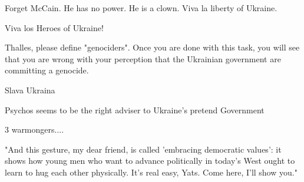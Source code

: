 
Forget McCain. He has no power. He is a clown. Viva la liberty of Ukraine.

\begin{itemize} %
Viva los Heroes of Ukraine!


Thalles, please define "genociders". Once you are done with this task, you will
see that you are wrong with your perception that the Ukrainian government are
committing a genocide.


Slava Ukraina
\end{itemize} %

Psychos seems to be the right adviser to Ukraine's pretend Government

3 warmongers....


"And this gesture, my dear friend, is called 'embracing democratic values': it
shows how young men who want to advance politically in today's West ought to
learn to hug each other physically. It's real easy, Yats. Come here, I'll show
you."
